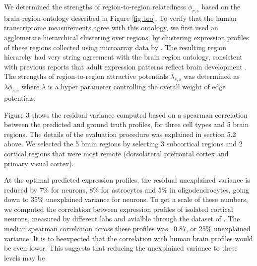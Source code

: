 We determined the strengths of region-to-region relatedness $\phi_{r,s}$ based on the brain-region-ontology described in Figure \ref{fig:bro}. To verify that the human transcriptome measurements agree with this ontology, we first used an agglomerate hierarchical clustering over regions, by clustering expression profiles of these regions collected using microarray data by \cite{kang2011spatio}. The resulting region hierarchy had very string agreement with the brain region ontology, consistent with previous reports that adult expression patterns reflect brain development \cite{zapala2005}. The strengths of region-to-region attractive potentials $\lambda_{r,s}$ was determined as $\lambda \phi_{r,s}$ where $\lambda$ is a hyper parameter controlling the overall weight of edge potentials. 

Figure 3 shows the residual variance computed based on a spearman correlation between the predicted and ground truth profiles, for three cell types and 5 brain regions. The details of the evaluation procedure was explained in section 5.2 above. We selected the 5 brain regions by selecting 3 subcortical regions and 2 cortical regions that were most remote (dorsolateral prefrontal cortex and primary visual cortex).

At the optimal predicted expression profiles, the residual unexplained variance is reduced by 7\% for neurons, 8\% for astrocytes and 5\% in oligodendrocytes, going down to $35\%$ unexplained variance for neurons. To get a scale of these numbers, we computed the correlation between expression profiles of isolated cortical neurons, measured by different labs and avialble through the dataset of \cite{okaty2011cell}. The median spearman correlation across these profiles was ~0.87, or 25\% unexplained variance. It is to beexpected that the correlation with human brain profiles would be even lower. This suggests that reducing the unexplained variance to these levels may be 







